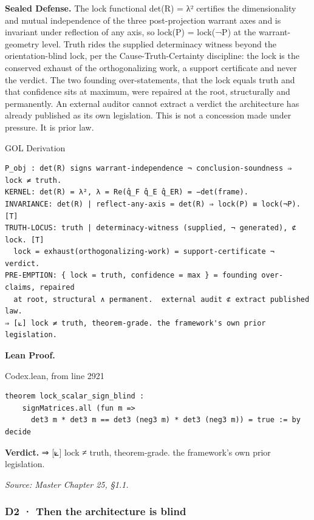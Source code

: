 \documentclass[10pt,twocolumn]{article}
\begin{document}
\textbf{Sealed Defense.} The lock functional det(R) = λ² certifies the
dimensionality and mutual independence of the three post-projection
warrant axes and is invariant under reflection of any axis, so lock(P) =
lock(¬P) at the warrant-geometry level. Truth rides the supplied
determinacy witness beyond the orientation-blind lock, per the
Cause-Truth-Certainty discipline: the lock is the conserved exhaust of
the orthogonalizing work, a support certificate and never the verdict.
The two founding over-statements, that the lock equals truth and that
confidence sits at maximum, were repaired at the root, structurally and
permanently. An external auditor cannot extract a verdict the
architecture has already published as its own legislation. This is not a
concession made under pressure. It is prior law.

\begin{golbox}{GOL Derivation}
\begin{lstlisting}[style=golv]
P_obj : det(R) signs warrant-independence ¬ conclusion-soundness ⇒ lock ≠ truth.
KERNEL: det(R) = λ², λ = Re(q̂_F q̂_E q̂_ER) = −det(frame).
INVARIANCE: det(R) | reflect-any-axis = det(R) ⇒ lock(P) ≡ lock(¬P). [T]
TRUTH-LOCUS: truth | determinacy-witness (supplied, ¬ generated), ⊄ lock. [T]
  lock = exhaust(orthogonalizing-work) = support-certificate ¬ verdict.
PRE-EMPTION: { lock = truth, confidence = max } = founding over-claims, repaired
  at root, structural ∧ permanent.  external audit ⊄ extract published law.
⇒ [⟀] lock ≠ truth, theorem-grade. the framework's own prior legislation.
\end{lstlisting}
\end{golbox}

\textbf{Lean Proof.}

\begin{leanexcerpt}{Codex.lean, from line 2921}
\begin{lstlisting}[style=leanx,firstnumber=2921]
theorem lock_scalar_sign_blind :
    signMatrices.all (fun m =>
      det3 m * det3 m == det3 (neg3 m) * det3 (neg3 m)) = true := by decide
\end{lstlisting}
\end{leanexcerpt}

\textbf{Verdict.} ⇒ {[}⟀{]} lock ≠ truth, theorem-grade. the framework's
own prior legislation.

\emph{Source: Master Chapter 25, §1.1.}

\hypertarget{d2-then-the-architecture-is-blind}{%
\subsubsection{D2 · Then the architecture is
blind}\label{d2-then-the-architecture-is-blind}}
\end{document}
